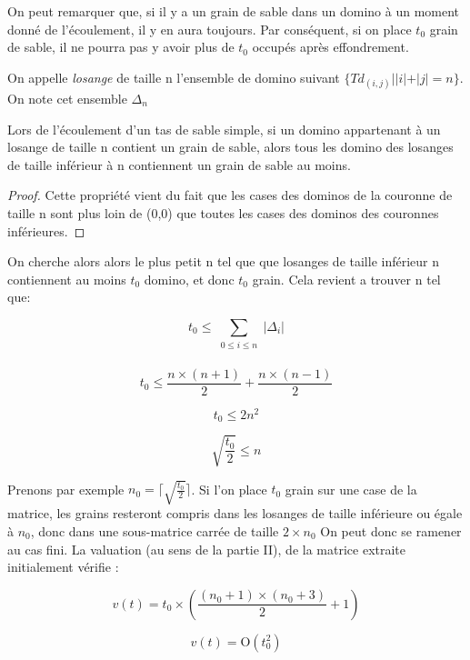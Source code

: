 On peut remarquer que, si il y a un grain de sable dans un domino à un moment donné de l'écoulement, il y en aura toujours. Par conséquent, si on place $t_0$ grain de sable, il ne pourra pas y avoir plus de $t_0$ occupés après effondrement.   

 On appelle \textit{losange} de taille n l'ensemble de domino suivant $\{ Td_{(i,j)} |   |i|+|j|= n \} $. On note cet ensemble $\Delta_n$
 
\begin{lem}
Lors de l'écoulement d'un tas de sable simple, si un domino appartenant à un losange de taille n contient un grain de sable, alors tous les domino des losanges de taille inférieur à n contiennent un grain de sable au moins.
\end{lem}

\begin{proof}
Cette propriété vient du fait que les cases des dominos de la couronne de taille n sont plus loin de (0,0) que toutes les cases des dominos des couronnes inférieures.  
\end{proof}

On cherche alors alors le plus petit n tel que que losanges de taille inférieur n contiennent au moins $t_0$ domino, et donc $t_0$ grain. Cela revient a trouver n tel que:

	\[
    t_0 \leq \sum\limits_{\substack{0 \leq i\leq n\\ }} |\Delta_{i}|
    \]

	\[
   t_0 \leq  \frac{n \times (n+1)}{2}+ \frac{n \times (n-1)}{2} 
	\] 
    
    \[
    t_0 \leq 2 n^2    
    \]

	\[
   \sqrt{\frac{t_0}{2}} \leq n
    \]
    
Prenons par exemple $n_0=\lceil \sqrt{\frac{t_0}{2}} \rceil $. Si l'on place $t_0$ grain sur une case de la matrice, les grains resteront compris dans les losanges de taille inférieure ou égale à $n_0$, donc dans une sous-matrice carrée de taille $2 \times n_0$ On peut donc se ramener au cas fini. La valuation (au sens de la partie II), de la matrice extraite initialement vérifie :

	\[
   v(t)=t_0 \times (\frac{(n_0+1) \times (n_0+3)}{2}+1)
    \]
    
    \[
    v(t)=\mathrm{O}(t_0^2)
    \]

